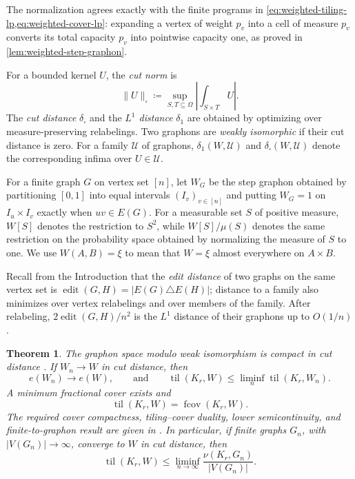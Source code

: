 \documentclass[10pt]{article}
\numberwithin{equation}{section}
\newtheorem{theorem}{Theorem}[section]
\newcommand{\til}{\operatorname{til}}
\newcommand{\fcov}{\operatorname{fcov}}
\newcommand{\edit}{\operatorname{edit}}
\newcommand{\distone}{\delta_1}
\newcommand{\distsq}{\delta_\square}
\begin{document}
The normalization agrees exactly with the finite programs in \cref{eq:weighted-tiling-lp,eq:weighted-cover-lp}: expanding a vertex of weight $p_v$ into a cell of measure $p_v$ converts its total capacity $p_v$ into pointwise capacity one, as proved in \cref{lem:weighted-step-graphon}.

For a bounded kernel $U$, the \emph{cut norm} is
\[
 \|U\|_\square\coloneqq\sup_{S,T\subseteq\Omega}\left|\int_{S\times T}U\right|.
\]
The \emph{cut distance} $\distsq$ and the \emph{$L^1$ distance} $\distone$ are obtained by optimizing over measure-preserving relabelings.  Two graphons are \emph{weakly isomorphic} if their cut distance is zero.  For a family $\mathcal U$ of graphons, $\distone(W,\mathcal U)$ and $\distsq(W,\mathcal U)$ denote the corresponding infima over $U\in\mathcal U$.

For a finite graph $G$ on vertex set $[n]$, let $W_G$ be the step graphon obtained by partitioning $[0,1]$ into equal intervals $(I_v)_{v\in[n]}$ and putting $W_G=1$ on $I_u\times I_v$ exactly when $uv\in E(G)$.  For a measurable set $S$ of positive measure, $W[S]$ denotes the restriction to $S^2$, while $W[S]/\mu(S)$ denotes the same restriction on the probability space obtained by normalizing the measure of $S$ to one.  We use $W(A,B)=\xi$ to mean that $W=\xi$ almost everywhere on $A\times B$.

Recall from the Introduction that the \emph{edit distance} of two graphs on the same vertex set is $\edit(G,H)=|E(G)\triangle E(H)|$; distance to a family also minimizes over vertex relabelings and over members of the family.  After relabeling, $2\edit(G,H)/n^2$ is the $L^1$ distance of their graphons up to $O(1/n)$.

\begin{theorem}\label{thm:graphon-inputs}
The graphon space modulo weak isomorphism is compact in cut distance \cite{BCLSV,Lovasz}.  If $W_n\to W$ in cut distance, then
\[
 e(W_n)\to e(W),
 \qquad\text{and}\qquad
 \til(K_r,W)\le\liminf_n\til(K_r,W_n).
\]
A minimum fractional cover exists and
\[
 \til(K_r,W)=\fcov(K_r,W).
\]
The required cover compactness, tiling--cover duality, lower semicontinuity, and finite-to-graphon result are given in \cite[Theorems~3.7, 3.14 and~3.16, equation~(3.7), and Theorem~3.4]{HHP21}.  In particular, if finite graphs $G_n$, with $|V(G_n)|\to\infty$, converge to $W$ in cut distance, then
\begin{equation}\label{eq:finite-tiling-transference}
 \til(K_r,W)\le\liminf_{n\to\infty}\frac{\nu(K_r,G_n)}{|V(G_n)|}.
\end{equation}
\end{theorem}
\end{document}
